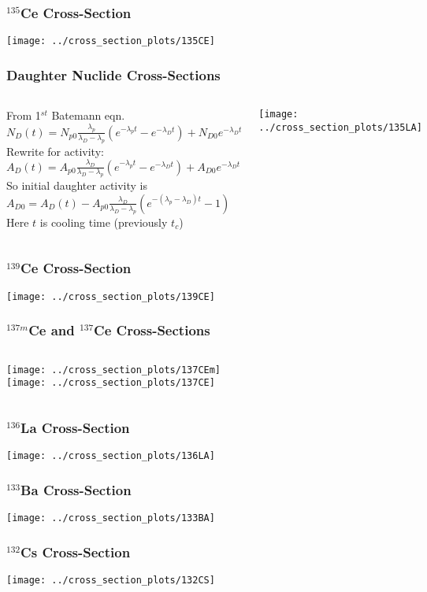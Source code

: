 \documentclass[12pt,xcolor=dvipsnames]{beamer}
\begin{document}
\begin{frame}
\frametitle{$^{135}$Ce Cross-Section}
\texttt{[image: ../cross\_section\_plots/135CE]}
\end{frame}

\begin{frame}
\frametitle{Daughter Nuclide Cross-Sections}

\begin{columns}[c]
\column{2.5in}
From 1$^{st}$ Batemann eqn. $N_D(t) = N_{p0}\frac{\lambda_p}{\lambda_D-\lambda_p}(e^{-\lambda_p t}-e^{-\lambda_D t})+N_{D0}e^{-\lambda_D t}$\\
Rewrite for activity: $A_D(t) = A_{p0}\frac{\lambda_D}{\lambda_D - \lambda_p}(e^{-\lambda_p t}-e^{-\lambda_D t})+A_{D0}e^{-\lambda_D t}$\\
So initial daughter activity is $A_{D0}=A_D(t)-A_{p0}\frac{\lambda_D}{\lambda_D - \lambda_p}(e^{-(\lambda_p-\lambda_D) t}-1)$\\
Here $t$ is cooling time (previously $t_c$)

\column{2.0in}
\texttt{[image: ../cross\_section\_plots/135LA]}
\end{columns}
\end{frame}

\begin{frame}
\frametitle{$^{139}$Ce Cross-Section}
\texttt{[image: ../cross\_section\_plots/139CE]}
\end{frame}

\begin{frame}
\frametitle{$^{137m}$Ce and $^{137}$Ce Cross-Sections}
\begin{columns}[c]
\column{2.5in}
\texttt{[image: ../cross\_section\_plots/137CEm]}
\\
\column{2.5in}
\texttt{[image: ../cross\_section\_plots/137CE]}
\\
\end{columns}
\end{frame}

\begin{frame}
\frametitle{$^{136}$La Cross-Section}
\texttt{[image: ../cross\_section\_plots/136LA]}
\end{frame}

\begin{frame}
\frametitle{$^{133}$Ba Cross-Section}
\texttt{[image: ../cross\_section\_plots/133BA]}
\end{frame}

\begin{frame}
\frametitle{$^{132}$Cs Cross-Section}
\texttt{[image: ../cross\_section\_plots/132CS]}
\end{frame}
\end{document}
